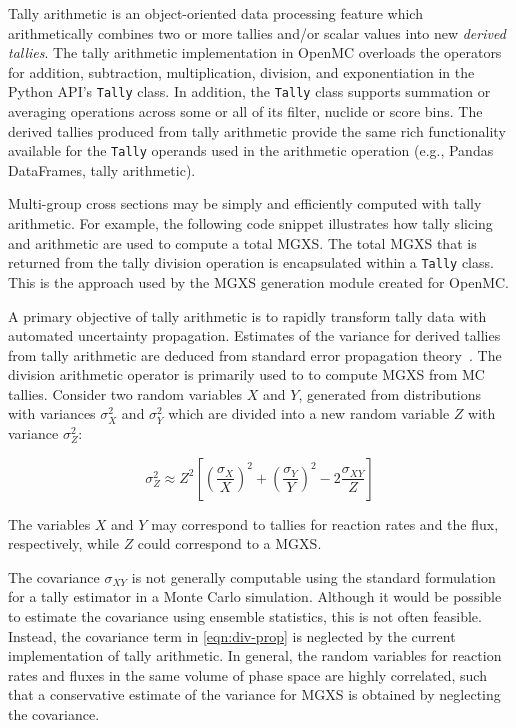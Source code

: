 Tally arithmetic is an object-oriented data processing feature which arithmetically combines two or more tallies and/or scalar values into new \emph{derived tallies}. The tally arithmetic implementation in OpenMC overloads the operators for addition, subtraction, multiplication, division, and exponentiation in the Python API's \texttt{Tally} class. In addition, the \texttt{Tally} class supports summation or averaging operations across some or all of its filter, nuclide or score bins. The derived tallies produced from tally arithmetic provide the same rich functionality available for the \texttt{Tally} operands used in the arithmetic operation (e.g., Pandas DataFrames, tally arithmetic).

Multi-group cross sections may be simply and efficiently computed with tally arithmetic. For example, the following code snippet illustrates how tally slicing and arithmetic are used to compute a total MGXS. The total MGXS that is returned from the tally division operation is encapsulated within a \texttt{Tally} class. This is the approach used by the MGXS generation module created for OpenMC.



A primary objective of tally arithmetic is to rapidly transform tally data with automated uncertainty propagation. Estimates of the variance for derived tallies from tally arithmetic are deduced from standard error propagation theory~\cite{bevington2003data}. The division arithmetic operator is primarily used to to compute MGXS from MC tallies. Consider two random variables $X$ and $Y$, generated from distributions with variances $\sigma_{X}^2$ and $\sigma_{Y}^2$ which are divided into a new random variable $Z$ with variance $\sigma_{Z}^2$:

\begin{equation}
\label{eqn:div-prop}
\sigma_{Z}^{2} \approx Z^{2}\left[\left(\frac{\sigma_{X}}{X}\right)^{2} + \left(\frac{\sigma_{Y}}{Y}\right)^{2} - 2\frac{\sigma_{XY}}{Z}\right]
\end{equation}

\noindent The variables $X$ and $Y$ may correspond to tallies for reaction rates and the flux, respectively, while $Z$ could correspond to a MGXS.

The covariance $\sigma_{XY}$ is not generally computable using the standard formulation for a tally estimator in a Monte Carlo simulation. Although it would be possible to estimate the covariance using ensemble statistics, this is not often feasible. Instead, the covariance term in \cref{eqn:div-prop} is neglected by the current implementation of tally arithmetic. In general, the random variables for reaction rates and fluxes in the same volume of phase space are highly correlated, such that a conservative estimate of the variance for MGXS is obtained by neglecting the covariance.

